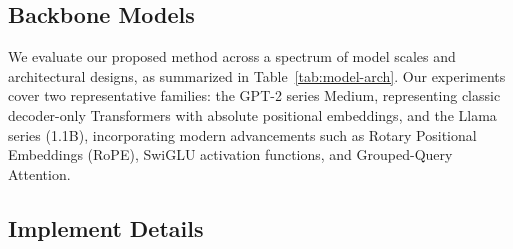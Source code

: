 \subsection{Backbone Models}
We evaluate our proposed method across a spectrum of model scales and architectural designs, as summarized in Table~\ref{tab:model-arch}. Our experiments cover two representative families: the GPT-2 series Medium, representing classic decoder-only Transformers with absolute positional embeddings, and the Llama series (1.1B), incorporating modern advancements such as Rotary Positional Embeddings (RoPE), SwiGLU activation functions, and Grouped-Query Attention. 
\begin{table}[ht]
\centering
\caption{Architectural configurations of the evaluated models. Models are grouped by family, covering a parameter range from 210M to 3B. $L$: Layers, $H$: Attention Heads, $d_{model}$: Embedding Dimension, $d_{ff}$: Hidden Dimension.}
\label{tab:model-arch}
\centering
{}
\end{table}





\subsection{Implement Details}
\label{sec:impl_details}


